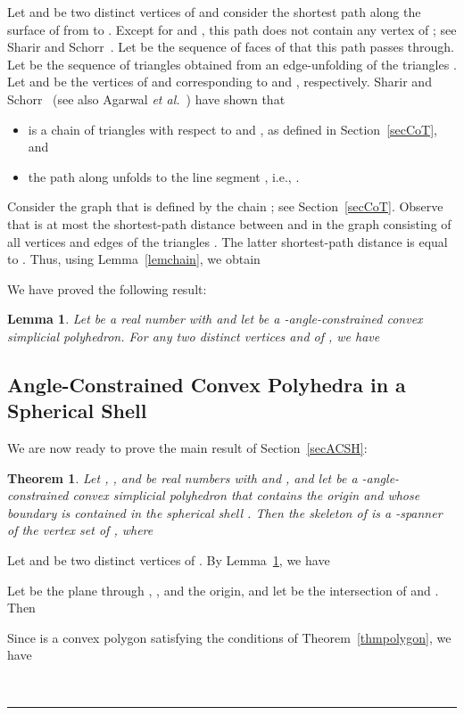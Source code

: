 \documentclass[12pt]{article}
\newtheorem{theorem}{Theorem}
\newtheorem{lemma}{Lemma}
\newcommand{\qed}{\rule{0.5em}{1.5ex}}
\newcommand{\fqed}{{\hfill~\qed}}
\newenvironment{proof}{{\noindent \bf Proof.}}
                      {{\hfill \fqed} \vspace{1em}}
\begin{document}
Let  and  be two distinct vertices of  and consider the 
shortest path  along the surface of  from  to . 
Except for  and , this path does not contain any vertex of ; 
see Sharir and Schorr~\cite{ss-spps-86}. Let  be 
the sequence of faces of  that this path passes through. Let 
 be the sequence of triangles 
obtained from an edge-unfolding of the triangles . 
Let  and  be the vertices of  and  corresponding to 
 and , respectively. Sharir and Schorr~\cite{ss-spps-86} 
(see also Agarwal \emph{et al.}~\cite{aaos-supa-97}) have shown that 
\begin{itemize}
\item  is a chain of triangles with respect to  and 
      , as defined in Section~\ref{secCoT}, and 
\item the path  along  unfolds to the line segment 
      , i.e., . 
\end{itemize} 
Consider the graph  that is defined by the chain 
; see Section~\ref{secCoT}. Observe that  
is at most the shortest-path distance between  and  in the graph 
consisting of all vertices and edges of the triangles 
. The latter shortest-path distance is equal to 
. Thus, using Lemma~\ref{lemchain}, we obtain 
 
We have proved the following result: 

\begin{lemma}  \label{lempartial} 
Let  be a real number with  and let  be 
a -angle-constrained convex simplicial polyhedron. 
For any two distinct vertices  and  of , we have 

\end{lemma} 

\subsection{Angle-Constrained Convex Polyhedra in a Spherical Shell}   
We are now ready to prove the main result of Section~\ref{secACSH}: 

\begin{theorem} 
Let , , and  be real numbers with  and 
, and let  be a -angle-constrained 
convex simplicial polyhedron that contains the origin and whose boundary 
is contained in the spherical shell . Then the skeleton of 
 is a -spanner of the vertex set of , where  
 
\end{theorem} 
\begin{proof}  
Let  and  be two distinct vertices of . 
By Lemma~\ref{lempartial}, we have 

Let  be the plane through , , and the origin, and let 
 be the intersection of  and . Then 
  
Since  is a convex polygon satisfying the conditions of 
Theorem~\ref{thmpolygon}, we have 
 
\end{proof} 
\end{document}
